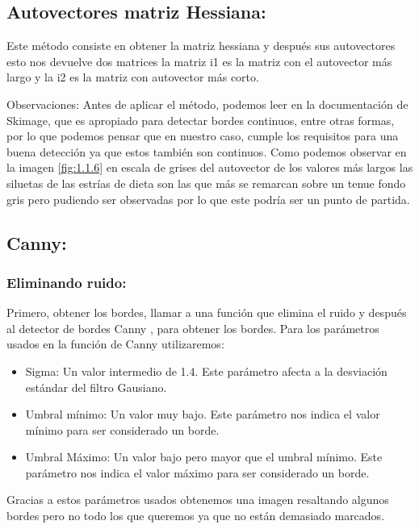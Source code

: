 \subsection{Autovectores matriz Hessiana:}
Este método consiste en obtener la matriz hessiana \cite{wiki:Hessiana} y después sus autovectores esto nos devuelve dos matrices la matriz i1 es la matriz con el autovector más largo y la i2 es la matriz con autovector más corto.



Observaciones: 
Antes de aplicar el método, podemos leer en la documentación de Skimage, que es apropiado para detectar bordes continuos, entre otras formas, por lo que podemos pensar que en nuestro caso, cumple los requisitos para una buena detección ya que estos también son continuos. 
Como podemos observar en la imagen \ref{fig:1.1.6} en escala de grises del autovector de los valores más largos las siluetas de las estrías de dieta son las que más se remarcan sobre un tenue fondo gris pero pudiendo ser observadas por lo que este podría ser un punto de partida.



\subsection{Canny:}

\subsubsection{Eliminando ruido:}
Primero, obtener los bordes, llamar a una función que elimina el ruido y después al detector de bordes Canny \cite{wiki:Canny}, para obtener los bordes.
Para los parámetros usados en la función de Canny utilizaremos:
\begin{itemize}
	\item Sigma: Un valor intermedio de 1.4.
	Este parámetro afecta a la desviación estándar del filtro Gausiano.
	\item Umbral mínimo: Un valor muy bajo.
	Este parámetro nos indica el valor mínimo para ser considerado un borde.
	\item Umbral Máximo: Un valor bajo pero mayor que el umbral mínimo.
	Este parámetro nos indica el valor máximo para ser considerado un borde.
\end{itemize}
Gracias a estos parámetros usados obtenemos una imagen resaltando algunos bordes pero no todo los que queremos ya que no están demasiado marcados.




